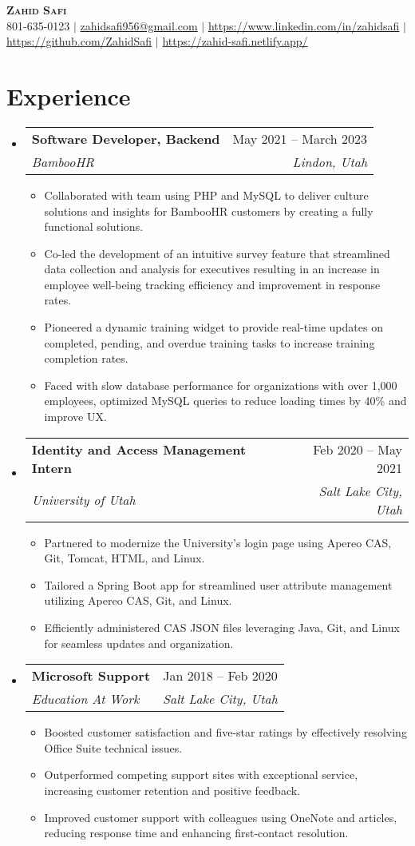 \documentclass[letterpaper,11pt]{article}
\makeatletter
\newcommand{\resumeItem}[1]{
  \item\small{
    {#1 \vspace{-2pt}}
  }
}
\newcommand{\resumeSubheading}[4]{
  \vspace{-2pt}\item
    \begin{tabular*}{0.97\textwidth}[t]{l@{\extracolsep{\fill}}r}
      \textbf{#1} & #2 \\
      \textit{\small#3} & \textit{\small #4} \\
    \end{tabular*}\vspace{-7pt}
}
\newcommand{\resumeSubHeadingListStart}{\begin{itemize}[leftmargin=0.15in, label={}]}
\newcommand{\resumeItemListStart}{\begin{itemize}}
\newcommand{\resumeItemListEnd}{\end{itemize}\vspace{-5pt}}
\makeatother
\begin{document}
\begin{center}
    \textbf{\Huge \scshape Zahid Safi} \\ \vspace{1pt}
    \small 801-635-0123 $|$ \href{mailto:zahidsafi956@gmail.com}{{zahidsafi956@gmail.com}} $|$
    \href{https://www.linkedin.com/in/zahidsafi}{{https://www.linkedin.com/in/zahidsafi}} $|$
    \href{https://github.com/ZahidSafi}{{https://github.com/ZahidSafi}} $|$
    \href{https://zahid-safi.netlify.app/}{https://zahid-safi.netlify.app/}
\end{center}


\section{\textbf{Experience}}
\resumeSubHeadingListStart

\resumeSubheading
{Software Developer, Backend}{May 2021 -- March 2023}
{BambooHR}{Lindon, Utah}
\resumeItemListStart
\resumeItem{Collaborated with team using PHP and MySQL to deliver culture solutions and insights for BambooHR customers by creating a fully functional solutions.}
\resumeItem{Co-led the development of an intuitive survey feature that streamlined data collection and analysis for executives resulting in an increase in employee well-being tracking efficiency and improvement in response rates.}
\resumeItem{Pioneered a dynamic training widget to provide real-time updates on completed, pending, and overdue training tasks to increase training completion rates.}
\resumeItem{Faced with slow database performance for organizations with over 1,000 employees, optimized MySQL queries to reduce loading times by 40\% and improve UX.}

\resumeItemListEnd

\resumeSubheading
{Identity and Access Management Intern}{Feb 2020 -- May 2021}
{University of Utah}{Salt Lake City, Utah}
\resumeItemListStart
\resumeItem{Partnered to modernize the University's login page using Apereo CAS, Git, Tomcat, HTML, and Linux.}
\resumeItem{Tailored a Spring Boot app for streamlined user attribute management utilizing Apereo CAS, Git, and Linux.}
\resumeItem{Efficiently administered CAS JSON files leveraging Java, Git, and Linux for seamless updates and organization.}
\resumeItemListEnd


\resumeSubheading
{Microsoft Support}{Jan 2018 -- Feb 2020}
{Education At Work}{Salt Lake City, Utah}
\resumeItemListStart
\resumeItem{Boosted customer satisfaction and five-star ratings by effectively resolving Office Suite technical issues.}
\resumeItem{Outperformed competing support sites with exceptional service, increasing customer retention and positive feedback.}
\resumeItem{Improved customer support with colleagues using OneNote and articles, reducing response time and enhancing first-contact resolution.}
\resumeItemListEnd
\resumeItemListEnd
\end{document}
